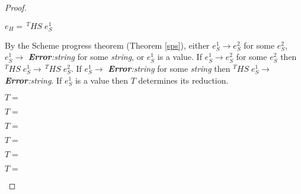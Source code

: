 \begin{hps}
\begin{proof}
\begin{hps-case-12}
\end{hps-case-12}
\begin{hps-case-13}
$e_{H}=\,^{T}HS\;e_{S}^{1}$

By the Scheme progress theorem (Theorem \ref{sps}), either $e_{S}^{1}\rightarrow e_{S}^{2}$ for some $e_{S}^{2}$, $e_{S}^{1}\rightarrow$ \emph{\textbf{Error}:\;string} for some \emph{string}, or $e_{S}^{1}$ is a value.  If $e_{S}^{1}\rightarrow e_{S}^{2}$ for some $e_{S}^{2}$ then $^{T}HS\;e_{S}^{1}\rightarrow\,^{T}HS\;e_{S}^{2}$.  If $e_{S}^{1}\rightarrow$ \emph{\textbf{Error}:\;string} for some \emph{string} then $^{T}HS\;e_{S}^{1}\rightarrow$ \emph{\textbf{Error}:\;string}.  If $e_{S}^{1}$ is a value then $T$ determines its reduction.
\end{hps-case-13}
\begin{hps-case-13-1}
$T=$

\end{hps-case-13-1}
\begin{hps-case-13-2}
$T=$

\end{hps-case-13-2}
\begin{hps-case-13-3}
$T=$

\end{hps-case-13-3}
\begin{hps-case-13-4}
$T=$

\end{hps-case-13-4}
\begin{hps-case-13-5}
$T=$

\end{hps-case-13-5}
\begin{hps-case-13-6}
$T=$

\end{hps-case-13-6}
\end{proof}
\end{hps}